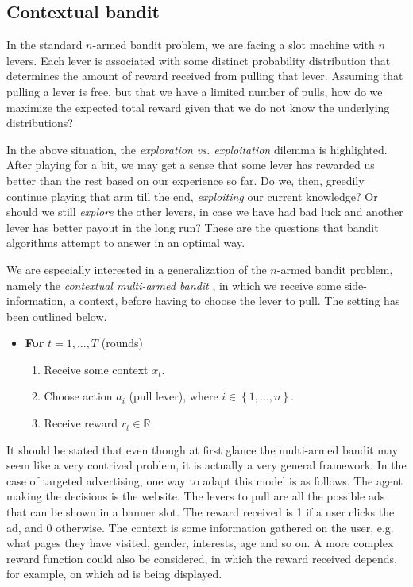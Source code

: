 \documentclass{article} %
\newcommand{\setof}[1]{\ensuremath{\left \{ #1 \right \}}}
\begin{document}


\subsection{Contextual bandit}

In the standard $n$-armed bandit problem, we are facing a slot machine with $n$
levers. Each lever is associated with some distinct probability distribution
that determines the amount of reward received from pulling that lever. Assuming
that pulling a lever is free, but that we have a limited number of pulls, how
do we maximize the expected total reward given that we do not know the
underlying distributions? \cite{book}

In the above situation, the \emph{exploration vs. exploitation} dilemma is
highlighted. After playing for a bit, we may get a sense that some lever has
rewarded us better than the rest based on our experience so far. Do we, then,
greedily continue playing that arm till the end, \emph{exploiting} our current
knowledge? Or should we still \emph{explore} the other levers, in case we have
had bad luck and another lever has better payout in the long run? These are the
questions that bandit algorithms attempt to answer in an optimal way.

We are especially interested in a generalization of the $n$-armed bandit
problem, namely the \emph{contextual multi-armed bandit}
\cite{langford2007epoch}, in which we receive some side-information, a context,
before having to choose the lever to pull. The setting has been outlined below.

\begin{itemize}
  \item[]
    \textbf{For} $t = 1, ..., T$ (rounds)
    \begin{enumerate}
      \item{Receive some context $x_t$.}
      \item{Choose action  $a_i$ (pull lever), where $i \in \setof{1,...,n}$.}
      \item{Receive reward $r_t \in \mathbb{R}$.}
    \end{enumerate}
\end{itemize}

It should be stated that even though at first glance the multi-armed bandit
may seem like a very contrived problem, it is actually a very general
framework. In the case of targeted advertising, one way to adapt this model
is as follows.  The agent making the decisions is the website. The levers to
pull are all the possible ads that can be shown in a banner slot. The reward
received is 1 if a user clicks the ad, and 0 otherwise. The context is some
information gathered on the user, e.g. what pages they have visited, gender,
interests, age and so on. A more complex reward function could also be
considered, in which the reward received depends, for example, on which ad is
being displayed.
\end{document}

